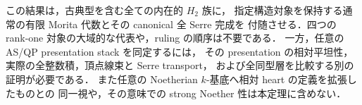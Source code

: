 \begin{remark}[この通常代数の役割]
この結果は，古典型を含む全ての内在的 $H_2$ 族に，
指定構造対象を保持する通常の有限 Morita 代数とその canonical 全 Serre 完成を
付随させる．四つの rank-one 対象の大域的な代表や，ruling の順序は不要である．
一方，任意の AS/QP presentation stack を同定するには，
その presentation の相対平坦性，実際の全整数積，頂点線束と Serre transport，
および全同型層を比較する別の証明が必要である．
また任意の Noetherian $k$-基底へ相対 heart の定義を拡張したものとの
同一視や，その意味での strong Noether 性は本定理に含めない．
\end{remark}
